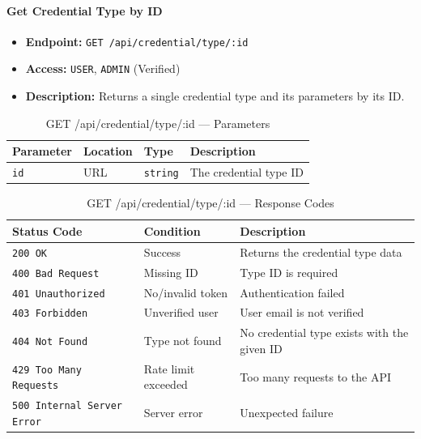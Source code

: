 \paragraph{Get Credential Type by ID}
\label{subsubsec:get-credential-type-by-id}

\begin{itemize}
  \item \textbf{Endpoint:} \texttt{GET /api/credential/type/:id}
  \item \textbf{Access:} \texttt{USER}, \texttt{ADMIN} (Verified)
  \item \textbf{Description:} Returns a single credential type and its parameters by its ID.
\end{itemize}

\begin{table}[H]
\centering
\renewcommand{\arraystretch}{1.3}
\begin{tabularx}{\textwidth}{|l|l|l|X|}
\hline
\textbf{Parameter} & \textbf{Location} & \textbf{Type} & \textbf{Description} \\
\hline
\texttt{id} & URL & \texttt{string} & The credential type ID \\
\hline
\end{tabularx}
\caption{GET /api/credential/type/:id — Parameters}
\label{tab:get-credential-type-by-id-params}
\end{table}

\begin{table}[H]
\centering
\renewcommand{\arraystretch}{1.3}
\begin{tabularx}{\textwidth}{|l|l|X|}
\hline
\textbf{Status Code} & \textbf{Condition} & \textbf{Description} \\
\hline
\texttt{200 OK}           & Success              & Returns the credential type data \\
\hline
\texttt{400 Bad Request}  & Missing ID           & Type ID is required \\
\hline
\texttt{401 Unauthorized} & No/invalid token     & Authentication failed \\
\hline
\texttt{403 Forbidden}    & Unverified user      & User email is not verified \\
\hline
\texttt{404 Not Found}    & Type not found       & No credential type exists with the given ID \\
\hline
\texttt{429 Too Many Requests} & Rate limit exceeded & Too many requests to the API \\
\hline
\texttt{500 Internal Server Error} & Server error & Unexpected failure \\
\hline
\end{tabularx}
\caption{GET /api/credential/type/:id — Response Codes}
\label{tab:get-credential-type-by-id-responses}
\end{table}
\FloatBarrier

